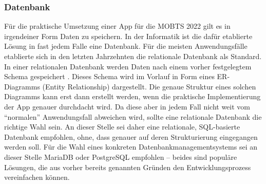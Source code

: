 \subsubsection*{Datenbank}
Für die praktische Umsetzung einer App für die MOBTS 2022 gilt es in irgendeiner Form Daten zu speichern.
In der Informatik ist die dafür etablierte Lösung in fast jedem Falle eine Datenbank.
Für die meisten Anwendungsfälle etablierte sich in den letzten Jahrzehnten die relationale Datenbank als Standard.
In einer relationalen Datenbank werden Daten nach einem vorher festgelegtem Schema gespeichert \autocite{B_AWS.o.J.}.
Dieses Schema wird im Vorlauf in Form eines ER-Diagramms (Entity Relationship) dargestellt.
Die genaue Struktur eines solchen Diagramms kann erst dann erstellt werden, wenn die praktische Implementierung der App genauer durchdacht wird.
Da diese aber in jedem Fall nicht weit vom \enquote{normalen} Anwendungsfall abweichen wird, sollte eine relationale Datenbank die richtige Wahl sein.
An dieser Stelle sei daher eine relationale, SQL-basierte Datenbank empfohlen, ohne, dass genauer auf deren Strukturierung eingegangen werden soll.
Für die Wahl eines konkreten Datenbankmanagementsystems sei an dieser Stelle MariaDB oder PostgreSQL empfohlen -- beides sind populäre Lösungen, die aus vorher bereits genannten Gründen den Entwicklungsprozess vereinfachen können.